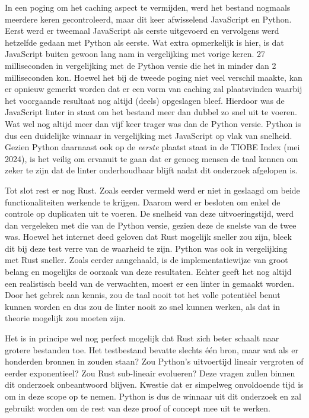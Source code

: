 In een poging om het caching aspect te vermijden, werd het bestand nogmaals meerdere keren gecontroleerd, maar dit keer afwisselend JavaScript en Python. Eerst werd er tweemaal JavaScript als eerste uitgevoerd en vervolgens werd hetzelfde gedaan met Python als eerste. Wat extra opmerkelijk is hier, is dat JavaScript buiten gewoon lang nam in vergelijking met vorige keren. 27 milliseconden in vergelijking met de Python versie die het in minder dan 2 milliseconden kon. Hoewel het bij de tweede poging niet veel verschil maakte, kan er opnieuw gemerkt worden dat er een vorm van caching zal plaatsvinden waarbij het voorgaande resultaat nog altijd (deels) opgeslagen bleef. Hierdoor was de JavaScript linter in staat om het bestand meer dan dubbel zo snel uit te voeren. Wat wel nog altijd meer dan vijf keer trager was dan de Python versie. Python is dus een duidelijke winnaar in vergelijking met JavaScript op vlak van snelheid. Gezien Python daarnaast ook op de \emph{eerste} plaatst staat in de TIOBE Index (mei 2024), is het veilig om ervanuit te gaan dat er genoeg mensen de taal kennen om zeker te zijn dat de linter onderhoudbaar blijft nadat dit onderzoek afgelopen is.

Tot slot rest er nog Rust. Zoals eerder vermeld werd er niet in geslaagd om beide functionaliteiten werkende te krijgen. Daarom werd er besloten om enkel de controle op duplicaten uit te voeren. De snelheid van deze uitvoeringstijd, werd dan vergeleken met die van de Python versie, gezien deze de snelste van de twee was. Hoewel het internet deed geloven dat Rust mogelijk sneller zou zijn, bleek dit bij deze test verre van de waarheid te zijn. Python was ook in vergelijking met Rust sneller. Zoals eerder aangehaald, is de implementatiewijze van groot belang en mogelijks de oorzaak van deze resultaten. Echter geeft het nog altijd een realistisch beeld van de verwachten, moest er een linter in gemaakt worden. Door het gebrek aan kennis, zou de taal nooit tot het volle potentiëel benut kunnen worden en dus zou de linter nooit zo snel kunnen werken, als dat in theorie mogelijk zou moeten zijn.

Het is in principe wel nog perfect mogelijk dat Rust zich beter schaalt naar grotere bestanden toe. Het testbestand bevatte slechts één bron, maar wat als er honderden bronnen in zouden staan? Zou Python's uitvoertijd lineair vergroten of eerder exponentieel? Zou Rust sub-lineair evolueren? Deze vragen zullen binnen dit onderzoek onbeantwoord blijven. Kwestie dat er simpelweg onvoldoende tijd is om in deze scope op te nemen.\newline
Python is dus de winnaar uit dit onderzoek en zal gebruikt worden om de rest van deze proof of concept mee uit te werken.

